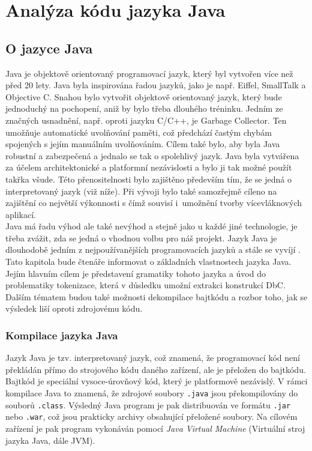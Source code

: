 \chapter{Analýza kódu jazyka Java}

	\section{O jazyce Java}
		Java \cite{javaEnviroment} je objektově orientovaný programovací jazyk, který byl vytvořen více než před 20 lety. Java byla inspirována řadou jazyků, jako je např. Eiffel, SmallTalk a Objective C. Snahou bylo vytvořit objektově orientovaný jazyk, který bude jednoduchý na pochopení, aniž by bylo třeba dlouhého tréninku. Jedním ze značných usnadnění, např. oproti jazyku C/C++, je Garbage Collector. Ten umožňuje automatické uvolňování paměti, což předchází častým chybám spojených s jejím manuálním uvolňováním.	Cílem také bylo, aby byla Java robustní a zabezpečená a jednalo se tak o spolehlivý jazyk. Java byla vytvářena za účelem architektonické a platformní nezávislosti a bylo ji tak možné použít takřka všude. Této přenositelnosti bylo zajištěno především tím, že se jedná o interpretovaný jazyk (viž níže). Při vývoji bylo také samozřejmě cíleno na zajištění co největší výkonnosti s čímž souvisí i~umožnění tvorby vícevláknových aplikací.\\
		
		Java má řadu výhod ale také nevýhod a stejně jako u každé jiné technologie, je třeba zvážit, zda se jedná o vhodnou volbu pro náš projekt. Jazyk Java je dlouhodobě jedním z nejpoužívanějších programovacích jazyků a stále se vyvíjí \cite{javaTrend}.\\
		
		Tato kapitola bude čtenáře informovat o základních vlastnostech jazyka Java. Jejím hlavním cílem je představení gramatiky tohoto jazyka a úvod do problematiky tokenizace, která v důsledku umožní extrakci konstrukcí DbC. Dalším tématem budou také možnosti dekompilace bajtkódu a rozbor toho, jak se výsledek liší oproti zdrojovému kódu.
		
		
		\subsection{Kompilace jazyka Java}	
			Jazyk Java je tzv. interpretovaný jazyk, což znamená, že programovací kód není překládán přímo do strojového kódu daného zařízení, ale je přeložen do bajtkódu. Bajtkód je speciální vysoce-úrovňový kód, který je platformově nezávislý. V rámci kompilace Java to znamená, že zdrojové soubory \texttt{.java} jsou překompilovány do souborů \texttt{.class}. Výsledný Java program je pak distribuován ve formátu \texttt{.jar} nebo \texttt{.war}, což jsou prakticky archivy obsahující přeložené soubory. Na cílovém zařízení je pak program vykonáván pomocí \emph{Java Virtual Machine} (Virtuální stroj jazyka Java, dále JVM).
			
